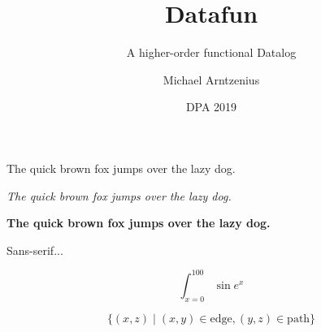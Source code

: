 \documentclass[dvipsnames]{beamer}
\title{Datafun}
\subtitle{A higher-order functional Datalog}
\author{Michael Arntzenius}
\institute{University of Birmingham}
\date{DPA 2019}
\begin{document}
\maketitle
\large

\begin{frame}{}
  The quick brown fox jumps over the lazy dog.

  \textit{The quick brown fox jumps over the lazy dog.}

  \textbf{The quick brown fox jumps over the lazy dog.}

  
  \textsf{Sans-serif...}

  \[ \int_{x=0}^{100} \sin e^x \]

  \[ \{ (x,z) \mathrel{|} (x,y) \in \text{edge}, (y,z) \in \text{path} \} \]
\end{frame}
\end{document}
